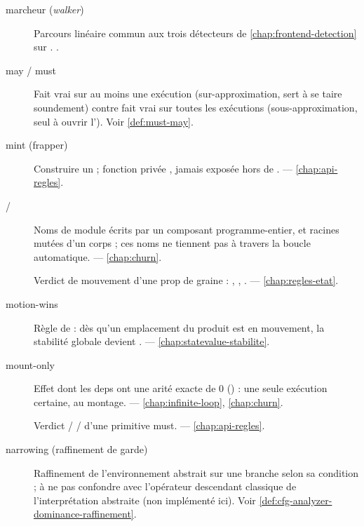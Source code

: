 \begin{description}
\item[marcheur (\emph{walker})] Parcours linéaire commun aux trois détecteurs de \cref{chap:frontend-detection} sur . .

\item[may / must] Fait vrai sur au moins une exécution (sur-approximation, sert à se taire soundement) contre fait vrai sur toutes les exécutions (sous-approximation, seul à ouvrir l'\Error{}). Voir \cref{def:must-may}.

\item[mint (frapper)] Construire un  ; fonction privée , jamais exposée hors de .  — \cref{chap:api-regles}.

\item[ / ] Noms de module écrits par un composant programme-entier, et racines mutées d'un corps ; ces noms ne \og tiennent\fg{} pas à travers la boucle automatique.  — \cref{chap:churn}.

\item[] Verdict de mouvement d'une prop de graine : , , .  — \cref{chap:regles-etat}.

\item[motion-wins] Règle de  : dès qu'un emplacement du produit  est en mouvement, la stabilité globale devient .  — \cref{chap:statevalue-stabilite}.

\item[mount-only] Effet dont les deps ont une arité exacte de 0 (\code{[]}) : une seule exécution certaine, au montage.  — \cref{chap:infinite-loop}, \cref{chap:churn}.

\item[] Verdict  /  /  d'une primitive must.  — \cref{chap:api-regles}.

\item[narrowing (raffinement de garde)] Raffinement de l'environnement abstrait sur une branche selon sa condition ; à ne pas confondre avec l'opérateur descendant classique de l'interprétation abstraite (non implémenté ici). Voir \cref{def:cfg-analyzer-dominance-raffinement}.


\end{description}
